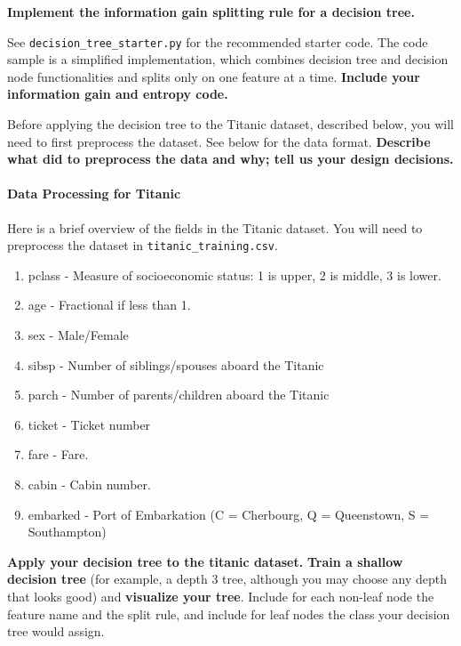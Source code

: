 \begin{Parts}


\Part \label{pt:treescratch} \textbf{Implement the information gain splitting rule for a decision tree.}

See \texttt{decision\_tree\_starter.py} for the recommended starter code. The code sample is a simplified implementation, which combines decision tree and decision node functionalities and splits only on one feature at a time. \textbf{Include your information gain and entropy code.}




\Part Before applying the decision tree to the Titanic dataset, described below, you will need to first preprocess the dataset. See below for the data format. \textbf{Describe what did to preprocess the data and why; tell us your design decisions.}

\paragraph{Data Processing for Titanic}
Here is a brief overview of the fields in the Titanic dataset. You will need to preprocess the dataset in \texttt{titanic\_training.csv}.
\begin{enumerate}
	\item pclass - Measure of socioeconomic status: 1 is upper, 2 is middle, 3 is lower.
	\item age - Fractional if less than 1.
	\item sex - Male/Female
	\item sibsp - Number of siblings/spouses aboard the Titanic
	\item parch - Number of parents/children aboard the Titanic
	\item ticket - Ticket number
	\item fare - Fare.
	\item cabin - Cabin number.
	\item embarked - Port of Embarkation (C = Cherbourg, Q = Queenstown, S = Southampton)
\end{enumerate}



\Part \textbf{Apply your decision tree to the titanic dataset.} \textbf{Train a shallow decision tree} (for example, a depth $3$ tree, although you may choose any depth that looks good) and \textbf{visualize your tree}. Include for each non-leaf node the feature name and the split rule, and include for leaf nodes the class your decision tree would assign.


\end{Parts}
